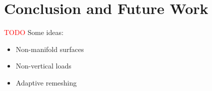 \documentclass[annual]{acmsiggraph}
\newcommand{\todo}[1]{\textcolor{red}{#1}}
\begin{document}
\section{Conclusion and Future Work}

\todo{TODO}
Some ideas:
\begin{itemize}
\item{Non-manifold surfaces}
\item{Non-vertical loads}
\item{Adaptive remeshing}
\end{itemize}





\let\otb=\thebibliography
\def\thebibliography#1{\otb{#1}\itemsep-1pt}

\end{document}
